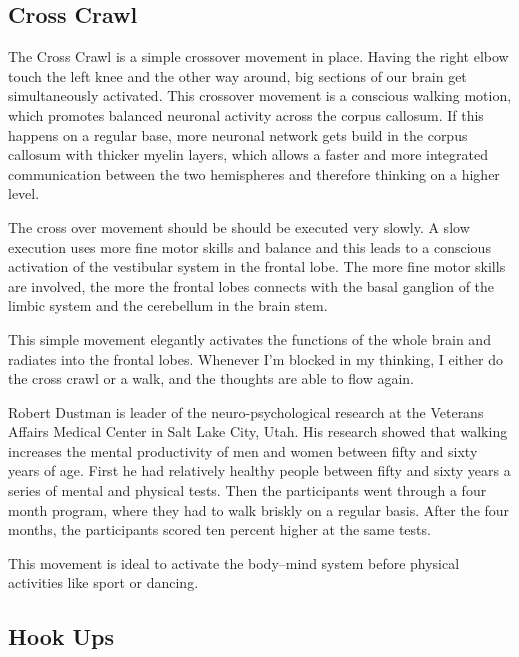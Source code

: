 \documentclass[../main.tex]{subfiles}
\begin{document}
  \subsection{Cross Crawl}
  
  The Cross Crawl is a simple crossover movement in place. Having the right elbow touch the left knee and the other way around, big sections of our brain get simultaneously activated.
  This crossover movement is a conscious walking motion, which promotes balanced neuronal activity across the corpus callosum.
  If this happens on a regular base, more neuronal network gets build in the corpus callosum with thicker myelin layers,
  which allows a faster and more integrated communication between the two hemispheres and therefore thinking on a higher level.
  
  {The cross over movement should be should be {executed very slowly}.
    A slow execution uses more {fine motor skills} and {balance}  and this leads to a conscious activation of the {vestibular system} in the {frontal lobe}.
    The more fine motor skills are involved, the more the frontal lobes connects with the basal ganglion of the limbic system and the cerebellum in the brain stem.}

  This simple movement elegantly activates the functions of the whole brain and radiates  into the frontal lobes.
  Whenever I'm blocked in my thinking, I either do the cross crawl or a walk, and the thoughts are able to flow again.

  Robert Dustman is leader of the neuro-psychological research at the Veterans Affairs Medical Center in Salt Lake City, Utah.
  His research showed that walking increases the mental productivity of men and women between fifty and sixty years of age.
  First he had relatively healthy people between fifty and sixty years a series of mental and physical tests.
  Then the participants went through a four month program, where they had to walk briskly on a regular basis.
  After the four months, the participants scored ten percent higher at  the same tests.

  This movement is ideal to {activate the body--mind system} before physical activities like sport or dancing.

  \subsection{Hook Ups}
  
\end{document}
